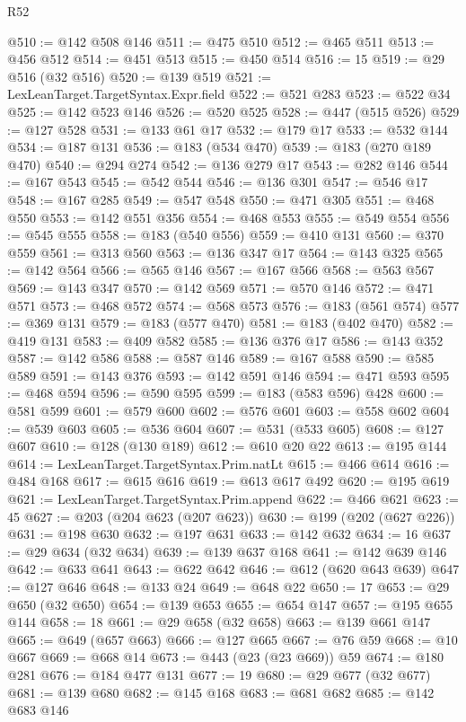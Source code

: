 \begin{lexlean}{R52}
\begin{coremodule}
{{{{{{{{{{{{{{{{{{{{{{{{{{{{{{{{{{{{{{{{{{{{{{{{{{{{{{{{{{{{{{{{{{{{{{{{{{{{{{{{{{{{{{{{{{{{{{{{{{{{{{{{{{{{{{{{{{{{{{{{{{{{{{{{{{{{{{{{{{{{{{{{{{{{{{{{{{{{{{{{{{{{{{{{{{{{{{{{{{{{{{{{{{{{{{{{{{{{{{@510 := @142 @508 @146
@511 := @475 @510
@512 := @465 @511
@513 := @456 @512
@514 := @451 @513
@515 := @450 @514
@516 := 15
@519 := @29 @516 (@32 @516)
@520 := @139 @519
@521 := LexLeanTarget.TargetSyntax.Expr.field
@522 := @521 @283
@523 := @522 @34
@525 := @142 @523 @146
@526 := @520 @525
@528 := @447 (@515 @526)
@529 := @127 @528
@531 := @133 @61 @17
@532 := @179 @17
@533 := @532 @144
@534 := @187 @131
@536 := @183 (@534 @470)
@539 := @183 (@270 @189 @470)
@540 := @294 @274
@542 := @136 @279 @17
@543 := @282 @146
@544 := @167 @543
@545 := @542 @544
@546 := @136 @301
@547 := @546 @17
@548 := @167 @285
@549 := @547 @548
@550 := @471 @305
@551 := @468 @550
@553 := @142 @551 @356
@554 := @468 @553
@555 := @549 @554
@556 := @545 @555
@558 := @183 (@540 @556)
@559 := @410 @131
@560 := @370 @559
@561 := @313 @560
@563 := @136 @347 @17
@564 := @143 @325
@565 := @142 @564
@566 := @565 @146
@567 := @167 @566
@568 := @563 @567
@569 := @143 @347
@570 := @142 @569
@571 := @570 @146
@572 := @471 @571
@573 := @468 @572
@574 := @568 @573
@576 := @183 (@561 @574)
@577 := @369 @131
@579 := @183 (@577 @470)
@581 := @183 (@402 @470)
@582 := @419 @131
@583 := @409 @582
@585 := @136 @376 @17
@586 := @143 @352
@587 := @142 @586
@588 := @587 @146
@589 := @167 @588
@590 := @585 @589
@591 := @143 @376
@593 := @142 @591 @146
@594 := @471 @593
@595 := @468 @594
@596 := @590 @595
@599 := @183 (@583 @596) @428
@600 := @581 @599
@601 := @579 @600
@602 := @576 @601
@603 := @558 @602
@604 := @539 @603
@605 := @536 @604
@607 := @531 (@533 @605)
@608 := @127 @607
@610 := @128 (@130 @189)
@612 := @610 @20 @22
@613 := @195 @144
@614 := LexLeanTarget.TargetSyntax.Prim.natLt
@615 := @466 @614
@616 := @484 @168
@617 := @615 @616
@619 := @613 @617 @492
@620 := @195 @619
@621 := LexLeanTarget.TargetSyntax.Prim.append
@622 := @466 @621
@623 := 45
@627 := @203 (@204 @623 (@207 @623))
@630 := @199 (@202 (@627 @226))
@631 := @198 @630
@632 := @197 @631
@633 := @142 @632
@634 := 16
@637 := @29 @634 (@32 @634)
@639 := @139 @637 @168
@641 := @142 @639 @146
@642 := @633 @641
@643 := @622 @642
@646 := @612 (@620 @643 @639)
@647 := @127 @646
@648 := @133 @24
@649 := @648 @22
@650 := 17
@653 := @29 @650 (@32 @650)
@654 := @139 @653
@655 := @654 @147
@657 := @195 @655 @144
@658 := 18
@661 := @29 @658 (@32 @658)
@663 := @139 @661 @147
@665 := @649 (@657 @663)
@666 := @127 @665
@667 := @76 @59
@668 := @10 @667
@669 := @668 @14
@673 := @443 (@23 (@23 @669)) @59
@674 := @180 @281
@676 := @184 @477 @131
@677 := 19
@680 := @29 @677 (@32 @677)
@681 := @139 @680
@682 := @145 @168
@683 := @681 @682
@685 := @142 @683 @146
}}}}}}}}}}}}}}}}}}}}}}}}}}}}}}}}}}}}}}}}}}}}}}}}}}}}}}}}}}}}}}}}}}}}}}}}}}}}}}}}}}}}}}}}}}}}}}}}}}}}}}}}}}}}}}}}}}}}}}}}}}}}}}}}}}}}}}}}}}}}}}}}}}}}}}}}}}}}}}}}}}}}}}}}}}}}}}}}}}}}}}}}}}}}}}}}}}}}}}
\end{coremodule}
\end{lexlean}
